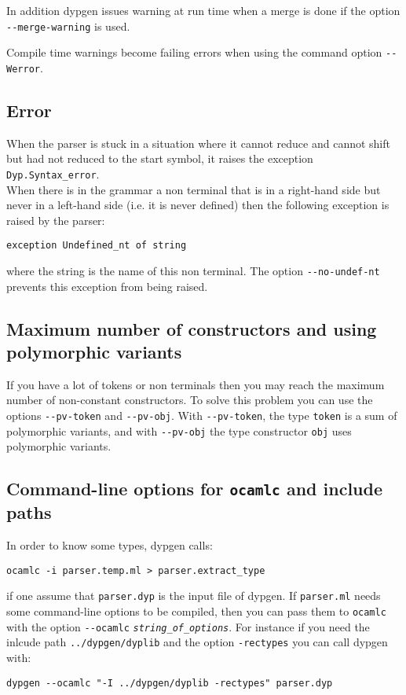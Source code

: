 \documentclass[12pt]{article}
\begin{document}
{In addition dypgen issues warning at run time when a merge is done if the option \verb|--merge-warning| is used.

Compile time warnings become failing errors when using the command option \verb|--Werror|.

\subsection{Error}

When the parser is stuck in a situation where it cannot reduce and cannot shift but had not reduced to the start symbol, it raises the exception \verb|Dyp.Syntax_error|.\\

When there is in the grammar a non terminal that is in a right-hand side but never in a left-hand side (i.e. it is never defined) then the following exception is raised by the parser:
\begin{verbatim}
exception Undefined_nt of string
\end{verbatim}
where the string is the name of this non terminal. The option \verb|--no-undef-nt| prevents this exception from being raised.

\subsection{Maximum number of constructors and using polymorphic variants}\label{--pv-obj}

If you have a lot of tokens or non terminals then you may reach the maximum number of non-constant constructors. To solve this problem you can use the options \verb|--pv-token| and \verb|--pv-obj|. With \verb|--pv-token|, the type \verb|token| is a sum of polymorphic variants, and with \verb|--pv-obj| the type constructor \verb|obj| uses polymorphic variants.

\subsection{Command-line options for \texttt{ocamlc} and include paths}\label{ocamlc}

In order to know some types, dypgen calls:
\begin{verbatim}
ocamlc -i parser.temp.ml > parser.extract_type
\end{verbatim}
if one assume that \verb|parser.dyp| is the input file of dypgen. If \verb|parser.ml| needs some command-line options to be compiled, then you can pass them to \verb|ocamlc| with the option \verb|--ocamlc| \texttt{\emph{string\_of\_options}}. For instance if you need the inlcude path \verb|../dypgen/dyplib| and the option \verb|-rectypes| you can call dypgen with:
\begin{verbatim}
dypgen --ocamlc "-I ../dypgen/dyplib -rectypes" parser.dyp
\end{verbatim}

}
\end{document}

